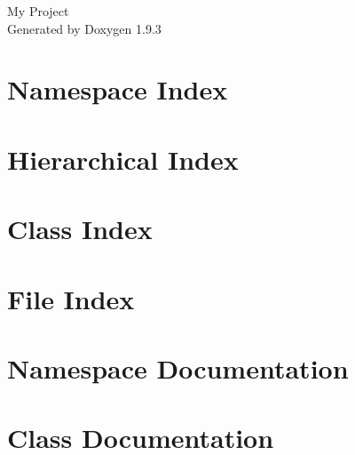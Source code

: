 \documentclass[twoside]{book}
\newcommand{\+}{\discretionary{\mbox{\scriptsize$\hookleftarrow$}}{}{}}
\newcommand{\clearemptydoublepage}{%
    \newpage{\pagestyle{empty}\cleardoublepage}%
  }
\begin{document}
  \raggedbottom
    \hypersetup{pageanchor=false,
                bookmarksnumbered=true,
                pdfencoding=unicode
               }
  \begin{titlepage}
  \vspace*{7cm}
  \begin{center}%
  {\Large My Project}\\
  \vspace*{1cm}
  {\large Generated by Doxygen 1.9.3}\\
  \end{center}
  \end{titlepage}
  \clearemptydoublepage
  \tableofcontents
  \clearemptydoublepage
  \hypersetup{pageanchor=true}
\chapter{Namespace Index}

\chapter{Hierarchical Index}

\chapter{Class Index}

\chapter{File Index}

\chapter{Namespace Documentation}

\chapter{Class Documentation}
















\end{document}
